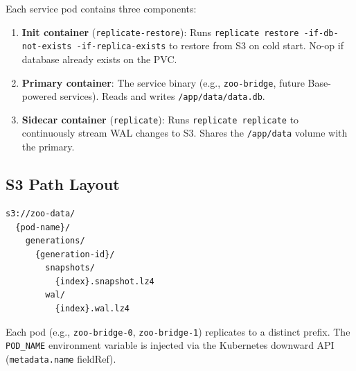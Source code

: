 Each service pod contains three components:

\begin{enumerate}
\item \textbf{Init container} (\texttt{replicate-restore}): Runs
  \texttt{replicate restore -if-db-not-exists -if-replica-exists}
  to restore from S3 on cold start.  No-op if database already
  exists on the PVC.

\item \textbf{Primary container}: The service binary (e.g.,
  \texttt{zoo-bridge}, future Base-powered services).  Reads and
  writes \texttt{/app/data/data.db}.

\item \textbf{Sidecar container} (\texttt{replicate}): Runs
  \texttt{replicate replicate} to continuously stream WAL changes
  to S3.  Shares the \texttt{/app/data} volume with the primary.
\end{enumerate}

\subsection{S3 Path Layout}

\begin{verbatim}
s3://zoo-data/
  {pod-name}/
    generations/
      {generation-id}/
        snapshots/
          {index}.snapshot.lz4
        wal/
          {index}.wal.lz4
\end{verbatim}

Each pod (e.g., \texttt{zoo-bridge-0}, \texttt{zoo-bridge-1})
replicates to a distinct prefix.  The \texttt{POD\_NAME}
environment variable is injected via the Kubernetes downward API
(\texttt{metadata.name} fieldRef).

